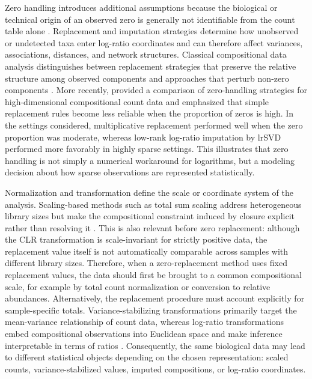 Zero handling introduces additional assumptions because the biological or technical origin of an observed zero is generally not identifiable from the count table alone \citep{martin2011dealing,quinn2019field}. Replacement and imputation strategies determine how unobserved or undetected taxa enter log-ratio coordinates and can therefore affect variances, associations, distances, and network structures. Classical compositional data analysis distinguishes between replacement strategies that preserve the relative structure among observed components and approaches that perturb non-zero components \citep{martin-fernandez2003dealing}. More recently, \citet{tang2026critical} provided a comparison of zero-handling strategies for high-dimensional compositional count data and emphasized that simple replacement rules become less reliable when the proportion of zeros is high. In the settings considered, multiplicative replacement performed well when the zero proportion was moderate, whereas low-rank log-ratio imputation by lrSVD performed more favorably in highly sparse settings. This illustrates that zero handling is not simply a numerical workaround for logarithms, but a modeling decision about how sparse observations are represented statistically.

Normalization and transformation define the scale or coordinate system of the analysis. Scaling-based methods such as total sum scaling address heterogeneous library sizes but make the compositional constraint induced by closure explicit rather than resolving it \citep{weiss2017normalization,aitchison1986statistical}. This is also relevant before zero replacement: although the CLR transformation is scale-invariant for strictly positive data, the replacement value itself is not automatically comparable across samples with different library sizes. Therefore, when a zero-replacement method uses fixed replacement values, the data should first be brought to a common compositional scale, for example by total count normalization or conversion to relative abundances. Alternatively, the replacement procedure must account explicitly for sample-specific totals. Variance-stabilizing transformations primarily target the mean-variance relationship of count data, whereas log-ratio transformations embed compositional observations into Euclidean space and make inference interpretable in terms of ratios \citep{aitchison1986statistical,greenacre2021compositional}. Consequently, the same biological data may lead to different statistical objects depending on the chosen representation: scaled counts, variance-stabilized values, imputed compositions, or log-ratio coordinates.

